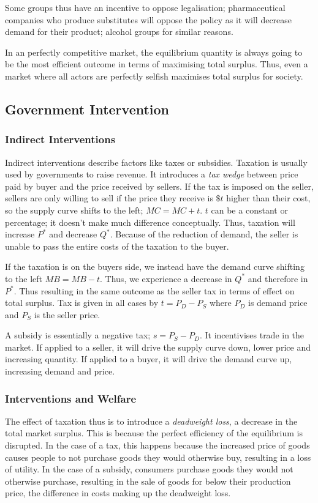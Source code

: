 \documentclass[12pt]{report}
\begin{document}
\begin{flushleft}
\bigskip
Some groups thus have an incentive to oppose legalisation; pharmaceutical companies who produce substitutes
will oppose the policy as it will decrease demand for their product; alcohol groups for similar reasons.

\bigskip
In an perfectly competitive market, the equilibrium quantity is always going to be the most efficient
outcome in terms of maximising total surplus. Thus, even a market where all actors are perfectly selfish
maximises total surplus for society.

\subsection*{Government Intervention}
\subsubsection*{Indirect Interventions}
Indirect interventions describe factors like taxes or subsidies. Taxation is usually used by governments to
raise revenue. It introduces a \textit{tax wedge} between price paid by buyer and the price received by sellers.
If the tax is imposed on the seller, sellers are only willing to sell if the price they receive is \(\$t\) higher
than their cost, so the supply curve shifts to the left; \(MC = MC + t\). \(t\) can be a constant or percentage;
it doesn't make much difference conceptually. Thus, taxation will increase \(P^*\) and decrease \(Q^*\). Because of 
the reduction of demand, the seller is unable to pass the entire costs of the taxation to the buyer.

\bigskip
If the taxation is on the buyers side, we instead have the demand curve shifting to the left \(MB = MB - t\). Thus,
we experience a decrease in \(Q^*\) and therefore in \(P^*\). Thus resulting in the same outcome as the seller tax 
in terms of effect on total surplus. Tax is given in all cases by \(t = P_D - P_S\) where \(P_D\) is demand price and 
\(P_S\) is the seller price.

\bigskip
A subsidy is essentially a negative tax; \(s = P_S - P_D\). It incentivises trade in the market. If applied to a
seller, it will drive the supply curve down, lower price and increasing quantity. If applied to a buyer, it will 
drive the demand curve up, increasing demand and price.

\subsubsection*{Interventions and Welfare}
The effect of taxation thus is to introduce a \textit{deadweight loss}, a decrease in the 
total market surplus. This is because the perfect efficiency of the equilibrium is disrupted.
In the case of a tax, this happens because the increased price of goods causes people to
not purchase goods they would otherwise buy, resulting in a loss of utility. In the case of
a subsidy, consumers purchase goods they would not otherwise purchase, resulting in the sale of
goods for below their production price, the difference in costs making up the deadweight loss.


\end{flushleft}
\end{document}
